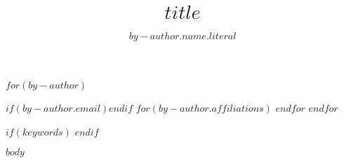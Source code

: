 \documentclass[acmcp,$if(anonymous)$anonymous,$endif$,pdftex]{acmart}
\begin{document}
\title{\huge $title$}

$for(by-author)$%
  \author{$by-author.name.literal$}%
  $if(by-author.email)$$endif$%
  $for(by-author.affiliations)$%
  $endfor$%
$endfor$%

\renewcommand{\shortauthors}{$shortauthors$}

$if(keywords)$
$endif$

\maketitle

$body$
\end{document}
